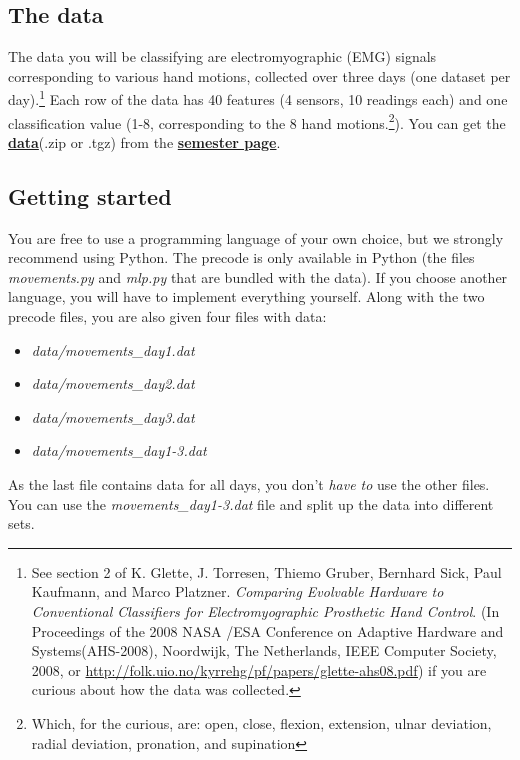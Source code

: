 \subsection*{The data}
 The data you will be classifying
are electromyographic (EMG) signals corresponding to various hand
motions, collected over three days (one dataset per day).\footnote{
See section 2 of K. Glette, J. Torresen, Thiemo Gruber, Bernhard Sick,
Paul Kaufmann, and Marco Platzner. \emph{Comparing Evolvable Hardware
to Conventional Classifiers for Electromyographic Prosthetic Hand
Control}. (In Proceedings of the 2008 NASA /ESA Conference on Adaptive
Hardware and Systems(AHS-2008), Noordwijk, The Netherlands, IEEE Computer
Society, 2008, or \url{http://folk.uio.no/kyrrehg/pf/papers/glette-ahs08.pdf})
if you are curious about how the data was collected.
} Each row of the data has 40 features (4 sensors, 10 readings each) and one classification value (1-8, corresponding to
the 8 hand motions.\footnote{
Which, for the curious, are: open, close, flexion, extension, ulnar
deviation, radial deviation, pronation, and supination
}). You can get the \href{http://www.uio.no/studier/emner/matnat/ifi/INF3490/h16/assignment-2}{\textbf{data}}(.zip or .tgz) from the \href{http://www.uio.no/studier/emner/matnat/ifi/INF3490/h16/index.html}{\textbf{semester page}}.


\subsection*{Getting started}

You are free to use a programming language of your own choice, but we strongly recommend using Python.
The precode is only available in Python (the files \emph{movements.py} and \emph{mlp.py} that are bundled with the data).
If you choose another language, you will have to implement everything yourself.
Along with the two precode files, you are also given four files with data:
\begin{itemize}
\item \emph{data/movements\_day1.dat}
\item \emph{data/movements\_day2.dat}
\item \emph{data/movements\_day3.dat}
\item \emph{data/movements\_day1-3.dat}
\end{itemize}
As the last file contains data for all days, you don't \emph{have to} use the other files.
You can use the \emph{movements\_day1-3.dat} file and split up the data into different sets.\\


